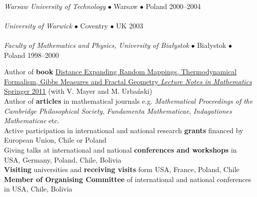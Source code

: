 \documentclass[a4paper, twoside]{scrreprt}
\begin{document}
\\
\noindent{}\textit{Warsaw University of Technology} $\bullet$  Warsaw $\bullet$ Poland \hfill 2000--2004\\ 
\\
\noindent{}\textit{University of Warwick} $\bullet$ Coventry $\bullet$ UK \hfill 2003\\
\\
\noindent{}\textit{Faculty of Mathematics and Physics, University
    of Bia{\l}ystok} $\bullet$  Bia{\l}ystok $\bullet$ Poland \hfill 1998--2000\\ 

\noindent\makebox[\linewidth]{\rule{\textwidth}{0.4pt}}

\vspace{0.1cm}


\noindent\llap{\FA \faBook\ \ }Author of \textbf{book} \href{http://www.amazon.com/Distance-Expanding-Thermodynamical-Formalism-Mathematics/dp/3642236499/ref=sr_1_1?s=books&ie=UTF8&qid=1410309067&sr=1-1}{Distance Expanding Random Mappings, Thermodynamical Formalism, Gibbs Measures and Fractal Geometry \textit{Lecture Notes in Mathematics} Springer 2011} (with V. Mayer and M. Urbański)\\
\noindent\llap{\FA \faPencil\ \ }Author of \textbf{articles} in 
mathematical journals e.g. 
\textit{Mathematical Proceedings of the Cambridge Philosophical Society}, \textit{Fundamenta Mathematicae}, \textit{Indagationes Mathematicae} etc.\\
\noindent\llap{\FA \faBeaker\ \ }Active participation in international and national research \textbf{grants} financed by European Union, Chile or Poland\\
\noindent\llap{\FA \faBullhorn\ \ }Giving talks at international and national \textbf{conferences and workshops} in USA, Germany, Poland, 
Chile, Bolivia\\
\noindent\llap{\FA \faExchange\ \ }\textbf{Visiting} 
universities and \textbf{receiving visits} form USA, France, Poland, Chile\\
\noindent\llap{\FA \faCalendar\ \ }\textbf{Member of Organising Committee} of international and national conferences in USA, Chile, Bolivia
\end{document}
